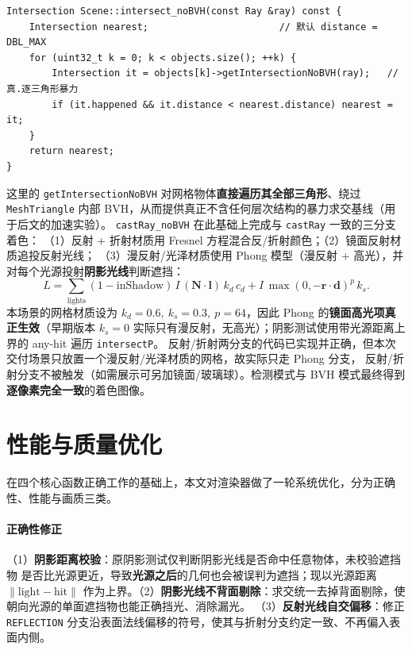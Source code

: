 \documentclass[11pt]{ctexart}
\begin{document}
\begin{lstlisting}
Intersection Scene::intersect_noBVH(const Ray &ray) const {
    Intersection nearest;                       // 默认 distance = DBL_MAX
    for (uint32_t k = 0; k < objects.size(); ++k) {
        Intersection it = objects[k]->getIntersectionNoBVH(ray);   // 真.逐三角形暴力
        if (it.happened && it.distance < nearest.distance) nearest = it;
    }
    return nearest;
}
\end{lstlisting}

\noindent 这里的 \texttt{getIntersectionNoBVH} 对网格物体\textbf{直接遍历其全部三角形}、绕过
\texttt{MeshTriangle} 内部 BVH，从而提供真正不含任何层次结构的暴力求交基线（用于后文的加速实验）。
\texttt{castRay\_noBVH} 在此基础上完成与 \texttt{castRay} 一致的三分支着色：
（1）反射 + 折射材质用 Fresnel 方程混合反/折射颜色；（2）镜面反射材质追投反射光线；
（3）漫反射/光泽材质使用 Phong 模型（漫反射 + 高光），并对每个光源投射\textbf{阴影光线}判断遮挡：
\begin{equation}
L=\sum_{\text{lights}} (1-\text{inShadow})\,I\,(\mathbf{N}\cdot\mathbf{l})\,k_d\,c_d
   + I\,\max(0,-\mathbf{r}\cdot\mathbf{d})^{p}\,k_s.
\end{equation}
本场景的网格材质设为 $k_d=0.6,\ k_s=0.3,\ p=64$，因此 Phong 的\textbf{镜面高光项真正生效}（早期版本
$k_s=0$ 实际只有漫反射，无高光）；阴影测试使用带光源距离上界的 any-hit 遍历 \texttt{intersectP}。
反射/折射两分支的代码已实现并正确，但本次交付场景只放置一个漫反射/光泽材质的网格，故实际只走 Phong 分支，
反射/折射分支不被触发（如需展示可另加镜面/玻璃球）。检测模式与 BVH 模式最终得到\textbf{逐像素完全一致}的着色图像。

\section{性能与质量优化}

在四个核心函数正确工作的基础上，本文对渲染器做了一轮系统优化，分为正确性、性能与画质三类。

\paragraph{正确性修正}（1）\textbf{阴影距离校验}：原阴影测试仅判断阴影光线是否命中任意物体，未校验遮挡物
是否比光源更近，导致\textbf{光源之后}的几何也会被误判为遮挡；现以光源距离 $\lVert \text{light}-\text{hit}\rVert$
作为上界。（2）\textbf{阴影光线不背面剔除}：求交统一去掉背面剔除，使朝向光源的单面遮挡物也能正确挡光、消除漏光。
（3）\textbf{反射光线自交偏移}：修正 \texttt{REFLECTION} 分支沿表面法线偏移的符号，使其与折射分支约定一致、不再偏入表面内侧。
\end{document}
